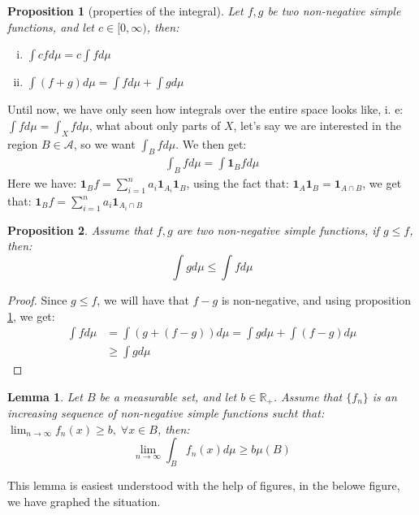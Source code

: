 \documentclass{article}
\newcommand{\R}{\mathbb{R}}
\newcommand{\A}{\mathcal{A}}
\newtheorem{prop}{Proposition}
\newtheorem{lemma}{Lemma}
\newtheorem{proof}{Proof}
\begin{document}
\begin{prop}[properties of the integral]
\label{prop: properties of the integral}
Let $f,g$ be two non-negative simple functions, and let $c\in [0,\infty)$, then: 
\begin{enumerate}[i)]
    \item $\int cfd\mu = c\int fd\mu$ 
    \item $\int (f+g)d\mu = \int fd\mu + \int gd\mu$
\end{enumerate}
\end{prop}

Until now, we have only seen how integrals over the entire space looks like, i. e: $\int fd\mu = \int_{X}fd\mu$, what about only parts of $X$, let's say we are interested in the region $B\in \A$, so we want $\int_{B} fd\mu$. We then get:
\begin{align*}
\int_{B}fd\mu = \int \bm{1}_{B}fd\mu    
\end{align*}
Here we have: $\bm{1}_{B}f = \sum_{i=1}^{n}a_{i}\bm{1}_{A_{i}}\bm{1}_{B}$, using the fact that: $\bm{1}_{A}\bm{1}_{B} = \bm{1}_{A\cap B}$, we get that: $\bm{1}_{B}f = \sum_{i=1}^{n}a_{i}\bm{1}_{A_{i}\cap B}$

\begin{prop}
Assume that $f,g$ are two non-negative simple functions, if $g\leq f$, then: 
\[\int g d\mu \leq \int f d\mu
\]
\end{prop} 

\begin{proof}
Since $g\leq f$, we will have that $f-g$ is non-negative, and using proposition \ref{prop: properties of the integral}, we get: 
\begin{align*}
    \int f d\mu &= \int (g + (f-g))d\mu = \int g d\mu + \int (f-g)d\mu \\
    &\geq \int gd\mu
\end{align*}
\end{proof}

\begin{lemma}
\label{lemma: lower bound on simple functions}
Let $B$ be a measurable set, and let $b\in \R_{+}$. Assume that $\{f_{n}\}$ is an increasing sequence of non-negative simple functions sucht that:\\ 
$\lim_{n\to \infty}f_{n}(x) \geq b, \; \forall x\in B$, then: 
\[ \lim_{n\to \infty}\int_{B} f_{n}(x)d\mu \geq b\mu(B)
\]
\end{lemma}
This lemma is easiest understood with the help of figures, in the belowe figure, we have graphed the situation. 
\end{document}
